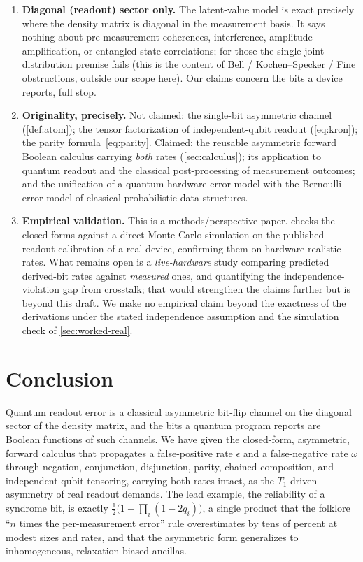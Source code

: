 \documentclass[a4paper,onecolumn,unpublished,nopdfoutputerror,allowtoday]{quantumarticle}
\numberwithin{equation}{section}
\theoremstyle{plain}
\theoremstyle{definition}
\theoremstyle{remark}
\newcommand{\eps}{\epsilon}
\begin{document}
\begin{enumerate}[leftmargin=1.6em]
  \item \textbf{Diagonal (readout) sector only.} The latent-value model is exact
        precisely where the density matrix is diagonal in the measurement basis.
        It says nothing about pre-measurement coherences, interference, amplitude
        amplification, or entangled-state correlations; for those the
        single-joint-distribution premise fails (this is the content of Bell /
        Kochen--Specker / Fine obstructions, outside our scope here). Our claims
        concern the bits a device reports, full stop.

  \item \textbf{Originality, precisely.} Not claimed: the single-bit asymmetric
        channel (\cref{def:atom}); the tensor factorization of independent-qubit
        readout (\cref{eq:kron}); the parity formula~\eqref{eq:parity}. Claimed:
        the reusable asymmetric forward Boolean calculus carrying \emph{both}
        rates (\cref{sec:calculus}); its application to quantum readout and the
        classical post-processing of measurement outcomes; and the unification of
        a quantum-hardware error model with the Bernoulli error model of classical
        probabilistic data structures.

  \item \textbf{Empirical validation.} This is a methods/perspective paper.
         checks the closed forms against a direct Monte Carlo
        simulation on the published readout calibration of a real device,
        confirming them on hardware-realistic rates. What remains open is a
        \emph{live-hardware} study comparing predicted derived-bit rates against
        \emph{measured} ones, and quantifying the independence-violation gap from
        crosstalk; that would strengthen the claims further but is beyond this
        draft. We make no empirical claim beyond the exactness of the derivations
        under the stated independence assumption and the simulation check of
        \cref{sec:worked-real}.
\end{enumerate}


\section{Conclusion}
\label{sec:conclusion}

Quantum readout error is a classical asymmetric bit-flip channel on the diagonal
sector of the density matrix, and the bits a quantum program reports are Boolean
functions of such channels. We have given the closed-form, asymmetric, forward
calculus that propagates a false-positive rate $\eps$ and a false-negative rate
$\omega$ through negation, conjunction, disjunction, parity, chained composition,
and independent-qubit tensoring, carrying both rates intact, as the $T_1$-driven
asymmetry of real readout demands. The lead example, the reliability of a
syndrome bit, is exactly $\tfrac12\bigl(1-\prod_i(1-2q_i)\bigr)$, a single product
that the folklore ``$n$ times the per-measurement error'' rule overestimates by
tens of percent at modest sizes and rates, and that the asymmetric form
generalizes to inhomogeneous, relaxation-biased ancillas.
\end{document}
